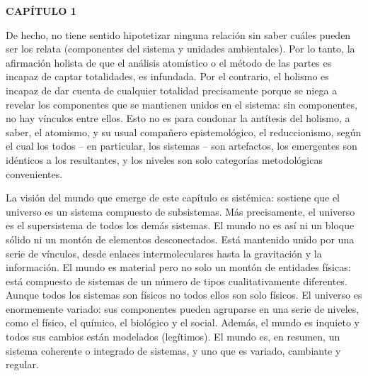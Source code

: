 \newpage
\fancyhf{}
\fancyhead[l]{\thepage}
\begin{center}
{\fontsize{16}{18}\selectfont \textbf{CAPÍTULO 1}}
\end{center}
\vspace{0.5cm}

{\fontsize{13}{15}\selectfont
De hecho, no tiene sentido hipotetizar ninguna relación sin saber cuáles pueden ser los relata 
(componentes del sistema y unidades ambientales). Por lo tanto, la afirmación holista de 
que el análisis atomístico o el método de las partes es incapaz de captar totalidades, es infundada. 
Por el contrario, el holismo es incapaz de dar cuenta de cualquier totalidad precisamente porque se niega 
a revelar los componentes que se mantienen unidos en el sistema: sin componentes, no hay vínculos entre ellos. 
Esto no es para condonar la antítesis del holismo, a saber, el atomismo, y su usual compañero epistemológico, el reduccionismo, 
según el cual los todos – en particular, los sistemas – son artefactos, los emergentes son idénticos a los resultantes, 
y los niveles son solo categorías metodológicas convenientes.

La visión del mundo que emerge de este capítulo es sistémica: sostiene que el universo es un sistema compuesto de subsistemas. 
Más precisamente, el universo es el supersistema de todos los demás sistemas. El mundo no es así ni un bloque sólido ni un montón de elementos desconectados. 
Está mantenido unido por una serie de vínculos, desde enlaces intermoleculares hasta la gravitación y la información. El mundo es material pero no solo un montón de entidades físicas: 
está compuesto de sistemas de un número de tipos cualitativamente diferentes. Aunque todos los sistemas son físicos no todos ellos son solo físicos. 
El universo es enormemente variado: sus componentes pueden agruparse en una serie de niveles, como el físico, el químico, el biológico y el social. Además, el mundo es inquieto y todos sus cambios están modelados (legítimos).
El mundo es, en resumen, un sistema coherente o integrado de sistemas, y uno que es variado, cambiante y regular.
}